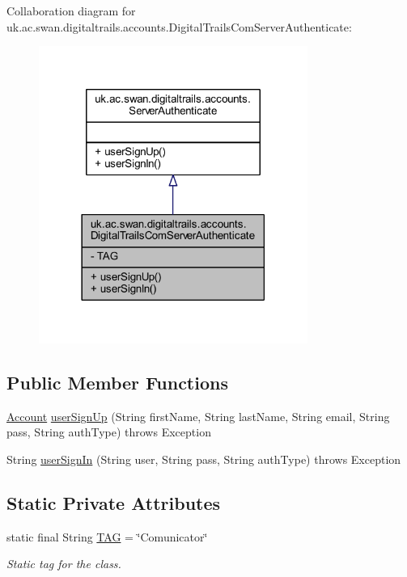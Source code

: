 Collaboration diagram for uk.\+ac.\+swan.\+digitaltrails.\+accounts.\+Digital\+Trails\+Com\+Server\+Authenticate\+:
\nopagebreak
\begin{figure}[H]
\begin{center}
\leavevmode
\includegraphics[width=249pt]{classuk_1_1ac_1_1swan_1_1digitaltrails_1_1accounts_1_1_digital_trails_com_server_authenticate__coll__graph}
\end{center}
\end{figure}
\subsection*{Public Member Functions}
\begin{DoxyCompactItemize}
\item 
\hyperlink{classuk_1_1ac_1_1swan_1_1digitaltrails_1_1components_1_1_account}{Account} \hyperlink{classuk_1_1ac_1_1swan_1_1digitaltrails_1_1accounts_1_1_digital_trails_com_server_authenticate_a010e082f3db78c10f95d0c8409b68048}{user\+Sign\+Up} (String first\+Name, String last\+Name, String email, String pass, String auth\+Type)  throws Exception 
\item 
String \hyperlink{classuk_1_1ac_1_1swan_1_1digitaltrails_1_1accounts_1_1_digital_trails_com_server_authenticate_af1155247d44e6014be313a575ca195a4}{user\+Sign\+In} (String user, String pass, String auth\+Type)  throws Exception 
\end{DoxyCompactItemize}
\subsection*{Static Private Attributes}
\begin{DoxyCompactItemize}
\item 
static final String \hyperlink{classuk_1_1ac_1_1swan_1_1digitaltrails_1_1accounts_1_1_digital_trails_com_server_authenticate_ac053fc24aa81c773b74db7c43c472110}{T\+A\+G} = \char`\"{}Comunicator\char`\"{}
\begin{DoxyCompactList}\small\item\em Static tag for the class. \end{DoxyCompactList}\end{DoxyCompactItemize}


